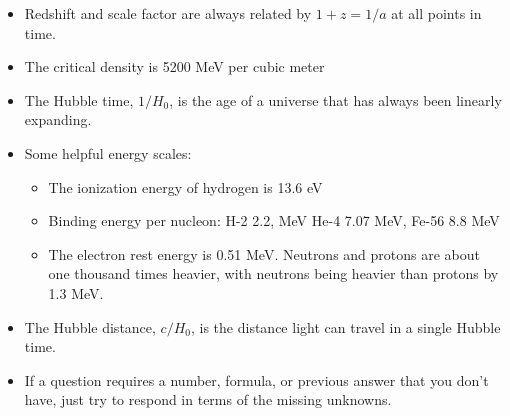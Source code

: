 \documentclass[12pt]{article}
\begin{document}
\begin{itemize}
\item Redshift and scale factor are always related by \(1+z = 1/a\) at all points in time.
\item The critical density is 5200 MeV per cubic meter
\item The Hubble time, \(1/H_0\), is the age of a universe that has always been linearly expanding.
\item Some helpful energy scales:
	\begin{itemize}
	\item The ionization energy of hydrogen is 13.6 eV
	\item Binding energy per nucleon: H-2 2.2, MeV He-4 7.07 MeV, Fe-56 8.8 MeV
	\item The electron rest energy is 0.51 MeV. Neutrons and protons are about one thousand times heavier, with neutrons being heavier than protons by 1.3 MeV.
	\end{itemize}
\item The Hubble distance, \(c/H_0\), is the distance light can travel in a single Hubble time.
\item If a question requires a number, formula, or previous answer that you don't have, just try to respond in terms of the missing unknowns.
\end{itemize}
\end{document}
